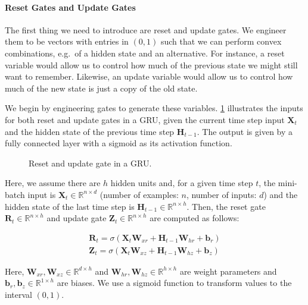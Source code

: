 \paragraph{Reset Gates and Update Gates}

The first thing we need to introduce are reset and update gates. We engineer them to be vectors with entries in $(0,1)$ such that we can perform convex combinations, e.g.\ of a hidden state and an alternative. For instance, a reset variable would allow us to control how much of the previous state we might still want to remember. Likewise, an update variable would allow us to control how much of the new state is just a copy of the old state.

We begin by engineering gates to generate these variables. \cref{fig:gru_1} illustrates the inputs for both reset and update gates in a GRU, given the current time step input $\mathbf{X}_t$ and the hidden state of the previous time step $\mathbf{H}_{t-1}$. The output is given by a fully connected layer with a sigmoid as its activation function.

\begin{figure}[hpt]
    \centering
    
    \caption{Reset and update gate in a GRU.}
    \label{fig:gru_1}
\end{figure}

Here, we assume there are $h$ hidden units and, for a given time step $t$, the mini-batch input is $\mathbf{X}_t \in \mathbb{R}^{n \times d}$ (number of examples: $n$, number of inputs: $d$) and the hidden state of the last time step is $\mathbf{H}_{t-1} \in \mathbb{R}^{n \times h}$. Then, the reset gate $\mathbf{R}_t \in \mathbb{R}^{n \times h}$ and update gate $\mathbf{Z}_t \in \mathbb{R}^{n \times h}$ are computed as follows:

$$
\begin{aligned}
\mathbf{R}_t = \sigma(\mathbf{X}_t \mathbf{W}_{xr} + \mathbf{H}_{t-1} \mathbf{W}_{hr} + \mathbf{b}_r)\\
\mathbf{Z}_t = \sigma(\mathbf{X}_t \mathbf{W}_{xz} + \mathbf{H}_{t-1} \mathbf{W}_{hz} + \mathbf{b}_z)
\end{aligned}
$$

Here, $\mathbf{W}_{xr}, \mathbf{W}_{xz} \in \mathbb{R}^{d \times h}$ and $\mathbf{W}_{hr}, \mathbf{W}_{hz} \in \mathbb{R}^{h \times h}$ are weight parameters and $\mathbf{b}_r, \mathbf{b}_z \in \mathbb{R}^{1 \times h}$ are biases. We use a sigmoid function to transform values to the interval $(0,1)$.

